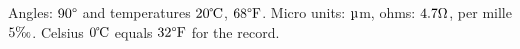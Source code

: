 \documentclass{article}
\begin{document}
Angles: $90\degree$ and temperatures $20\celsius$, $68\degree\mathrm{F}$.
Micro units: $\micro$m, ohms: $4.7\ohm$, per mille $5\perthousand$.
Celsius $0\celsius$ equals $32\degree\mathrm{F}$ for the record.
\end{document}
